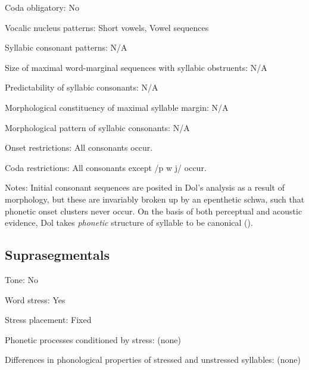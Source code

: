 {\begin{appendixdesc}
\item[Coda obligatory:] No

\item[Vocalic nucleus patterns:] Short vowels, Vowel sequences

\item[Syllabic consonant patterns:] N/A

\item[Size of maximal word-marginal sequences with syllabic obstruents:] N/A

\item[Predictability of syllabic consonants:] N/A

\item[Morphological constituency of maximal syllable margin:] N/A

\item[Morphological pattern of syllabic consonants:] N/A

\item[Onset restrictions:] All consonants occur.

\item[Coda restrictions:] All consonants except /p w j/ occur.

\item[Notes:] Initial consonant sequences are posited in Dol’s analysis as a result of morphology, but these are invariably broken up by an epenthetic schwa, such that phonetic onset clusters never occur. On the basis of both perceptual and acoustic evidence, Dol takes \textit{phonetic} structure of syllable to be canonical (\citeyear[35--37]{Dol2007}).

\end{appendixdesc}
\subsection*{Suprasegmentals}
\begin{appendixdesc}

\item[Tone:] No

\item[Word stress:] Yes

\item[Stress placement:] Fixed

\item[Phonetic processes conditioned by stress:] (none)

\item[Differences in phonological properties of stressed and unstressed syllables:] (none)


\end{appendixdesc}}
